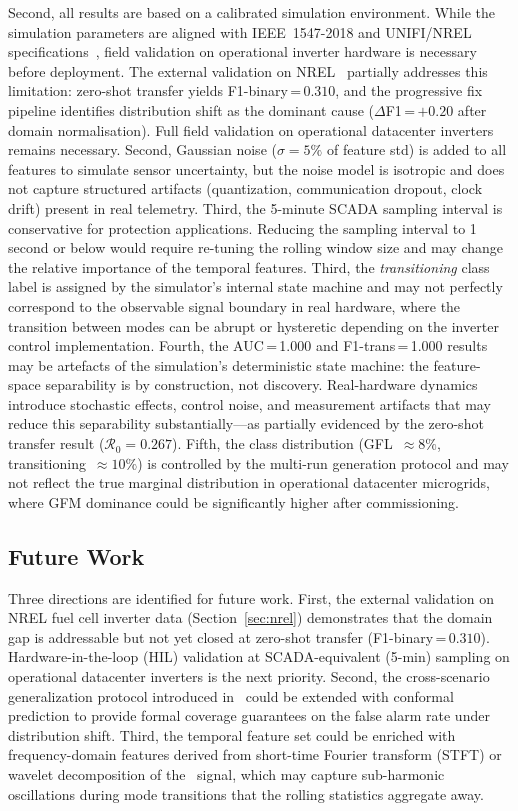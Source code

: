 \documentclass[journal]{IEEEtran}
\newcommand{\rocof}{\text{RoCoF}}
\begin{document}
Second, all results are based on a calibrated simulation environment.
While the simulation parameters are aligned with IEEE~1547-2018 and
UNIFI/NREL specifications~\cite{b_unifi}, field validation on
operational inverter hardware is necessary before deployment.
The external validation on NREL~\cite{b_nrel253} partially addresses
this limitation: zero-shot transfer yields F1-binary\,=\,$0.310$,
and the progressive fix pipeline identifies distribution shift as the
dominant cause ($\Delta$F1\,=\,$+0.20$ after domain normalisation).
Full field validation on operational datacenter inverters remains necessary.
Second, Gaussian noise ($\sigma = 5\%$ of feature std) is added
to all features to simulate sensor uncertainty, but the noise model
is isotropic and does not capture structured artifacts (quantization,
communication dropout, clock drift) present in real telemetry.
Third, the 5-minute SCADA sampling interval is conservative for
protection applications.
Reducing the sampling interval to 1 second or below would require
re-tuning the rolling window size and may change the relative
importance of the temporal features.
Third, the \emph{transitioning} class label is assigned by the
simulator's internal state machine and may not perfectly correspond
to the observable signal boundary in real hardware, where the
transition between modes can be abrupt or hysteretic depending
on the inverter control implementation.
Fourth, the AUC\,=\,1.000 and F1-trans\,=\,1.000 results may
be artefacts of the simulation's deterministic state machine:
the feature-space separability is by construction, not discovery.
Real-hardware dynamics introduce stochastic effects, control noise,
and measurement artifacts that may reduce this separability
substantially---as partially evidenced by the zero-shot transfer
result ($\mathcal{R}_0 = 0.267$).
Fifth, the class distribution (GFL~$\approx 8\%$,
transitioning~$\approx 10\%$) is controlled by the multi-run
generation protocol and may not reflect the true marginal distribution
in operational datacenter microgrids, where GFM dominance could
be significantly higher after commissioning.

\subsection{Future Work}

Three directions are identified for future work.
First, the external validation on NREL fuel cell inverter data
(Section~\ref{sec:nrel}) demonstrates that the domain gap is
addressable but not yet closed at zero-shot transfer (F1-binary\,=\,$0.310$).
Hardware-in-the-loop (HIL) validation at SCADA-equivalent (5-min) sampling
on operational datacenter inverters is the next priority.
Second, the cross-scenario generalization protocol introduced
in~\cite{b_nb06} could be extended with conformal prediction to
provide formal coverage guarantees on the false alarm rate under
distribution shift.
Third, the temporal feature set could be enriched with
frequency-domain features derived from short-time Fourier transform
(STFT) or wavelet decomposition of the \rocof\ signal, which may
capture sub-harmonic oscillations during mode transitions that
the rolling statistics aggregate away.
\end{document}
